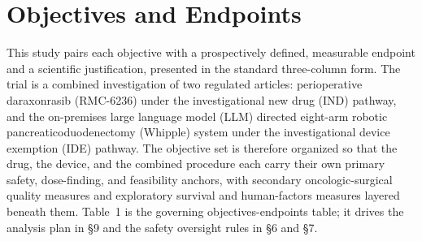 \section{Objectives and Endpoints}

This study pairs each objective with a prospectively defined, measurable endpoint
and a scientific justification, presented in the standard three-column form. The
trial is a combined investigation of two regulated articles: perioperative
daraxonrasib (RMC-6236) under the investigational new drug (IND) pathway, and the
on-premises large language model (LLM) directed eight-arm robotic
pancreaticoduodenectomy (Whipple) system under the investigational device
exemption (IDE) pathway. The objective set is therefore organized so that the
drug, the device, and the combined procedure each carry their own primary
safety, dose-finding, and feasibility anchors, with secondary oncologic-surgical
quality measures and exploratory survival and human-factors measures layered
beneath them. Table~1 is the governing objectives-endpoints table; it drives the
analysis plan in \S9 and the safety oversight rules in \S6 and \S7.

\vspace{0.3em}

